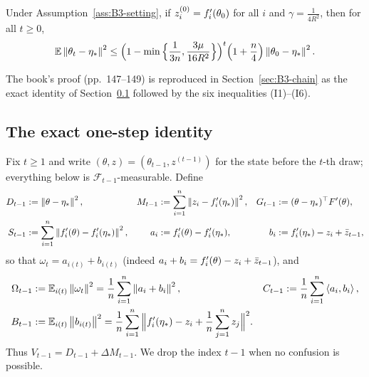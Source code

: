 \begin{proposition}\label{prop:B3-prop59}
Under Assumption~\ref{ass:B3-setting}, if $z^{(0)}_i=f'_i(\theta_0)$ for all $i$ and $\gamma=\frac{1}{4R^2}$, then for all $t\ge0$,
\begin{equation}\label{ineq:B3-prop59}
\mathbb{E}\left\|\theta_t-\eta_\ast\right\|^2\le\Big(1-\min\Big\{\frac{1}{3n},\frac{3\mu}{16R^2}\Big\}\Big)^t\Big(1+\frac n4\Big)\left\|\theta_0-\eta_\ast\right\|^2 .
\end{equation}
\end{proposition}
The book's proof (pp.~147--149) is reproduced in Section~\ref{sec:B3-chain} as the exact identity of Section~\ref{sec:B3-exact} followed by the six inequalities (I1)--(I6).

\subsection{The exact one-step identity}\label{sec:B3-exact}

Fix $t\ge1$ and write $(\theta,z)=(\theta_{t-1},z^{(t-1)})$ for the state before the $t$-th draw; everything below is $\mathcal F_{t-1}$-measurable. Define
\begin{align*}
D_{t-1}&:=\left\|\theta-\eta_\ast\right\|^2, &
M_{t-1}&:=\sum_{i=1}^n\left\|z_i-f'_i(\eta_\ast)\right\|^2, &
G_{t-1}&:=(\theta-\eta_\ast)^\top F'(\theta),\\
S_{t-1}&:=\sum_{i=1}^n\left\|f'_i(\theta)-f'_i(\eta_\ast)\right\|^2, &
a_i&:=f'_i(\theta)-f'_i(\eta_\ast), &
b_i&:=f'_i(\eta_\ast)-z_i+\bar z_{t-1},
\end{align*}
so that $\omega_t=a_{i(t)}+b_{i(t)}$ (indeed $a_i+b_i=f'_i(\theta)-z_i+\bar z_{t-1}$), and
\begin{align*}
\Omega_{t-1}&:=\mathbb{E}_{i(t)}\left\|\omega_t\right\|^2=\frac1n\sum_{i=1}^n\left\|a_i+b_i\right\|^2, &
C_{t-1}&:=\frac1n\sum_{i=1}^n\left\langle a_i, b_i \right\rangle,\\
B_{t-1}&:=\mathbb{E}_{i(t)}\left\|b_{i(t)}\right\|^2=\frac1n\sum_{i=1}^n\Big\|f'_i(\eta_\ast)-z_i+\frac1n\sum_{j=1}^n z_j\Big\|^2 .
\end{align*}
Thus $V_{t-1}=D_{t-1}+\Delta M_{t-1}$. We drop the index $t-1$ when no confusion is possible.

